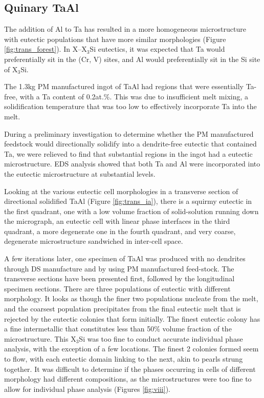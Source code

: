\subsection{Quinary TaAl}

The addition of Al to Ta has resulted in a more homogeneous microstructure with eutectic populations that have more similar morphologies (Figure \ref{fig:trans_forest}).  In X--X$_3$Si eutectics, it was expected that Ta would preferentially sit in the (Cr, V) sites, and Al would preferentially sit in the Si site of X$_3$Si.  

The 1.3kg PM manufactured ingot of TaAl had regions that were essentially Ta-free, with a Ta content of 0.2at.\%.  This was due to insufficient melt mixing, a solidification temperature that was too low to effectively incorporate Ta into the melt.  

During a preliminary investigation to determine whether the PM manufactured feedstock would directionally solidify into a dendrite-free eutectic that contained Ta, we were relieved to find that substantial regions in the ingot had a eutectic microstructure.  EDS analysis showed that both Ta and Al were incorporated into the eutectic microstructure at substantial levels.

Looking at the various eutectic cell morphologies in a transverse section of directional solidified TaAl (Figure \ref{fig:trans_ia}), there is a squirmy eutectic in the first quadrant, one with a low volume fraction of solid-solution running down the micrograph, an eutectic cell with linear phase interfaces in the third quadrant, a more degenerate one in the fourth quadrant, and very coarse, degenerate microstructure sandwiched in inter-cell space.

A few iterations later, one specimen of TaAl was produced with no dendrites through DS manufacture and by using PM manufactured feed-stock. The transverse sections have been presented first, followed by the longitudinal specimen sections.  There are three populations of eutectic with different morphology.  It looks as though the finer two populations nucleate from the melt, and the coarsest population precipitates from the final eutectic melt that is rejected by the eutectic colonies that form initially.  The finest eutectic colony has a fine intermetallic that constitutes less than 50\% volume fraction of the microstructure.  This X$_3$Si was too fine to conduct accurate individual phase analysis, with the exception of a few locations.  The finest 2 colonies formed seem to flow, with each eutectic domain linking to the next, akin to pearls strung together.  It was difficult to determine if the phases occurring in cells of different morphology had different compositions, as the microstructures were too fine to allow for individual phase analysis (Figures \ref{fig:viii}).  


